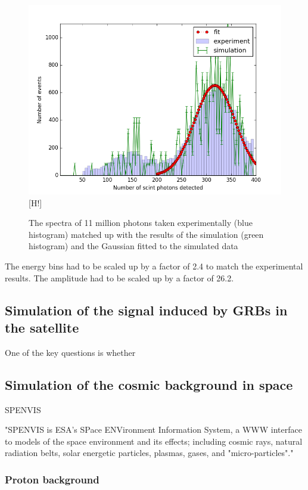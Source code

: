 \documentclass[12pt, a4paper,titlepage]{article}
\numberwithin{equation}{section}
\numberwithin{figure}{section}
\begin{document}
\begin{figure}[h!]
\includegraphics[width=150.0mm]{images/calibration_photon_yield.png}[H!]
\caption{The spectra of 11 million photons taken experimentally (blue histogram) matched up with the results of the simulation (green histogram) and the Gaussian fitted to the simulated data}
\end{figure}

The energy bins had to be scaled up by a factor of 2.4 to match the experimental results. The amplitude had to be scaled up by a factor of 26.2.

\pagebreak

\subsection{Simulation of the signal induced by GRBs in the satellite}

One of the key questions is whether 

\subsection{Simulation of the cosmic background in space}

SPENVIS \cite{spenvis}

"SPENVIS is ESA's SPace ENVironment Information System, a WWW interface to models of the space environment and its effects; including cosmic rays, natural radiation belts, solar energetic particles, plasmas, gases, and "micro-particles"."

\subsubsection{Proton background}
\end{document}
